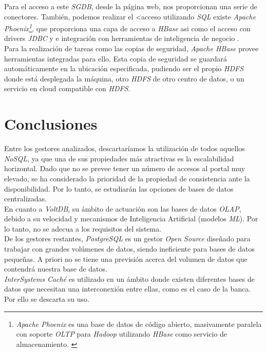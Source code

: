 \documentclass[3pt]{article}
\begin{document}
Para el acceso a este \emph{SGDB}, desde la página web, nos proporcionan una serie de conectores. También, podemos realizar el <acceso utilizando \emph{SQL} existe \emph{Apache Phoenix\footnote{\emph{Apache Phoenix} es una base de datos de código abierto, masivamente paralela con soporte \emph{OLTP} para \emph{Hadoop} utilizando \emph{HBase} como servicio de almacenamiento. \cite{WIKI:11}}}, que proporciona una capa de acceso a \emph{HBase} asi como el acceso con drivers \emph{JDBC} y e integración con herramientas de inteligencia de negocio \cite{WIKI:8}. \\
Para la realización de tareas como las copias de seguridad, \emph{Apache HBase} provee herramientas integradas para ello. Esta copia de seguridad se guardará automáticamente en la ubicación especificada, pudiendo ser el propio \emph{HDFS} donde está desplegada la máquina, otro \emph{HDFS} de otro centro de datos, o un servicio en cloud compatible con \emph{HDFS}. \cite{AP:8}\\

\newpage

\section{Conclusiones}

Entre los gestores analizados, descartaríamos la utilización de todos aquellos \emph{NoSQL}, ya que una de sus propiedades más atractivas es la escalabilidad horizontal. Dado que no se prevee tener un número de accesos al portal muy elevado, se ha considerado la prioridad de la propiedad de consistencia ante la disponibilidad. Por lo tanto, se estudiarán las opciones de bases de datos centralizadas. \\

En cuanto a \emph{VoltDB}, su ámbito de actuación son las bases de datos \emph{OLAP}, debido a su velocidad y mecanismos de Inteligencia Artificial (modelos \emph{ML}). Por lo tanto, no se adecua a los requisitos del sistema. \\

De los gestores restantes, \emph{PostgreSQL} es un gestor \emph{Open Source} diseñado para trabajar con grandes volúmenes de datos, siendo ineficiente para bases de datos pequeñas. A priori no se tiene una previsión acerca del volumen de datos que contendrá nuestra base de datos.\\

\emph{InterSystems Caché} es utilizado en un ámbito donde existen diferentes bases de datos que necesitan una interconexión entre ellas, como es el caso de la banca. Por ello se descarta su uso.\\
\end{document}
